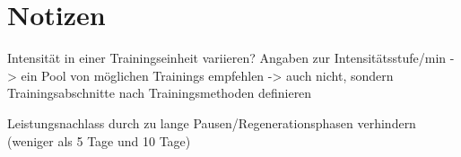 \section{Notizen}
    \item Intensität in einer Trainingseinheit variieren? Angaben zur Intensitätsstufe/min -> ein Pool von möglichen Trainings empfehlen -> auch nicht, sondern Trainingsabschnitte nach Trainingsmethoden definieren
    \item Leistungsnachlass durch zu lange Pausen/Regenerationsphasen verhindern (weniger als 5 Tage und 10 Tage)
